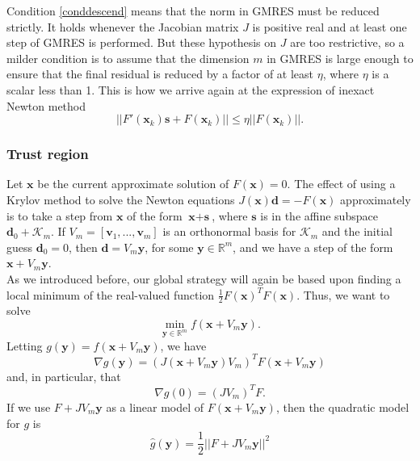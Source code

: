  Condition \eqref{conddescend}  means that the norm in GMRES must be reduced strictly. It holds whenever the Jacobian matrix $J$ is positive real and at least one step of GMRES is performed. But these hypothesis on $J$ are too restrictive, so a milder condition is to assume that the dimension $m$ in GMRES is large enough to ensure that the final residual is reduced by a factor of at least $\eta$, where $\eta$ is a scalar less than 1. This is how we arrive again at the expression of inexact Newton method
 \begin{equation*}
 ||F'(\textbf{x}_k)\textbf{s}+F(\textbf{x}_k)|| \leq \eta ||F(\textbf{x}_k)||.
  \end{equation*}
 \subsubsection{Trust region} Let $\textbf{x}$ be the current approximate solution of $F(\textbf{x})=0$. The effect of using a Krylov method to solve the Newton equations $J(\textbf{x})\textbf{d}= -F(\textbf{x})$ approximately is to take a step from $\textbf{x}$ of the form $\textbf{x} + \textbf{s}$, where $\textbf{s}$ is in the affine subspace $\textbf{d}_0 + \mathcal{K}_m$. If $V_m =[\textbf{v}_1,...,\textbf{v}_m]$ is an orthonormal basis for $\mathcal{K}_m$ and the initial guess $\textbf{d}_0 =0$, then $\textbf{d} = V_m \textbf{y}$, for some $\textbf{y} \in \mathbb{R}^m$, and we have a step of the form $\textbf{x} + V_m \textbf{y}$. \\
 As we introduced before, our global strategy will again be based upon finding a local minimum of the real-valued function $\frac{1}{2} F(\textbf{x})^TF(\textbf{x})$. Thus, we want to solve 
 \begin{equation}
 \label{minimiz_f}
 \min_{\textbf{y} \in \mathbb{R}^m}{f(\textbf{x} + V_m \textbf{y})}.
 \end{equation}
 Letting $g(\textbf{y}) = f(\textbf{x}+V_m \textbf{y})$, we have 
 \begin{equation*}
 \nabla g(\textbf{y}) = (J(\textbf{x} +V_m\textbf{y})V_m)^TF(\textbf{x}+ V_m\textbf{y})
 \end{equation*}
and, in particular, that 
 \begin{equation*}
 \nabla g(0) = (JV_m)^TF.
 \end{equation*}
If we use $F +J V_m \textbf{y}$ as a linear model of $F(\textbf{x} +V_m \textbf{y})$, then the quadratic model for $g$ is 
\begin{equation*}
\hat{g}(\textbf{y})= \frac{1}{2} ||F+JV_m\textbf{y}||^2
\end{equation*}
